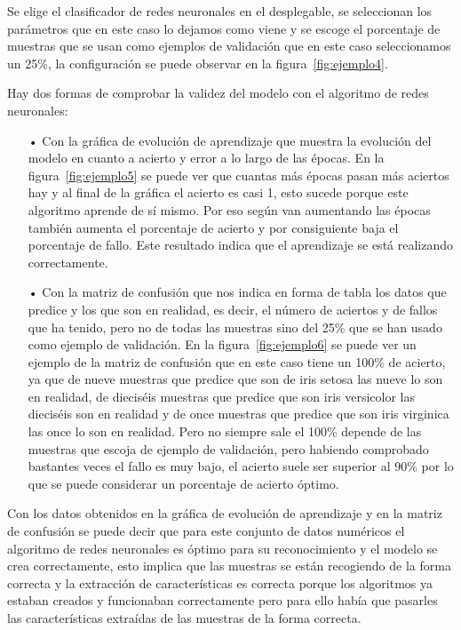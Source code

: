 \documentclass[a4paper, 12pt]{book}
\begin{document}
Se elige el clasificador de redes neuronales en el desplegable, se seleccionan los parámetros que en este caso lo dejamos como viene y se escoge el porcentaje de muestras que se usan como ejemplos de validación que en este caso seleccionamos un 25\%, la configuración se puede observar en la figura~\ref{fig:ejemplo4}.

Hay dos formas de comprobar la validez del modelo con el algoritmo de redes neuronales:

\begin{itemize}
 \item[•] Con la gráfica de evolución de aprendizaje que muestra la evolución del modelo en cuanto a acierto y error a lo largo de las épocas. En la figura~\ref{fig:ejemplo5} se puede ver que cuantas más épocas pasan más aciertos hay y al final de la gráfica el acierto es casi 1, esto sucede porque este algoritmo aprende de sí mismo.
Por eso según van aumentando las épocas también aumenta el porcentaje de acierto y por consiguiente baja el porcentaje de fallo. Este resultado indica que el aprendizaje se está realizando correctamente.
 \item[•] Con la matriz de confusión que nos indica en forma de tabla los datos que predice y los que son en realidad, es decir, el número de aciertos y de fallos que ha tenido, pero no de todas las muestras sino del 25\% que se han usado como ejemplo de validación. 
En la figura~\ref{fig:ejemplo6} se puede ver un ejemplo de la matriz de confusión que en este caso tiene un 100\% de acierto, ya que de nueve muestras que predice que son de iris setosa las nueve lo son en realidad, de dieciséis muestras que predice que son iris versicolor las dieciséis son en realidad y de once muestras que predice que son iris virginica las once lo son en realidad.
Pero no siempre sale el 100\% depende de las muestras que escoja de ejemplo de validación, pero habiendo comprobado bastantes veces el fallo es muy bajo, el acierto suele ser superior al 90\% por lo que se puede considerar un porcentaje de acierto óptimo.
 \end{itemize} 

Con los datos obtenidos en la gráfica de evolución de aprendizaje y en la matriz de confusión se puede decir que para este conjunto de datos numéricos el algoritmo de redes neuronales es óptimo para su reconocimiento y el modelo se crea correctamente, esto implica que las muestras se están recogiendo de la forma correcta y la extracción de características es correcta porque los algoritmos ya estaban creados y funcionaban correctamente pero para ello había que pasarles las características extraídas de las muestras de la forma correcta.
\end{document}
